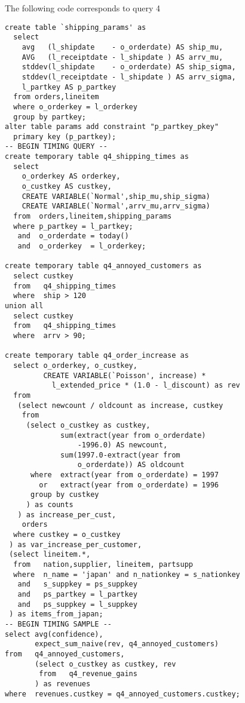 The following code corresponds to query 4
\begin{footnotesize}
\begin{verbatim}
create table `shipping_params' as
  select 
    avg   (l_shipdate    - o_orderdate) AS ship_mu,
    AVG   (l_receiptdate - l_shipdate ) AS arrv_mu,
    stddev(l_shipdate    - o_orderdate) AS ship_sigma,
    stddev(l_receiptdate - l_shipdate ) AS arrv_sigma,
    l_partkey AS p_partkey
  from orders,lineitem
  where o_orderkey = l_orderkey
  group by partkey;
alter table params add constraint "p_partkey_pkey" 
  primary key (p_partkey);
-- BEGIN TIMING QUERY --
create temporary table q4_shipping_times as
  select
    o_orderkey AS orderkey,
    o_custkey AS custkey,
    CREATE VARIABLE(`Normal',ship_mu,ship_sigma)
    CREATE VARIABLE(`Normal',arrv_mu,arrv_sigma)
  from  orders,lineitem,shipping_params
  where p_partkey = l_partkey;
   and  o_orderdate = today()
   and  o_orderkey  = l_orderkey;

create temporary table q4_annoyed_customers as
  select custkey
  from   q4_shipping_times
  where  ship > 120
union all
  select custkey
  from   q4_shipping_times
  where  arrv > 90;

create temporary table q4_order_increase as
  select o_orderkey, o_custkey,
         CREATE VARIABLE(`Poisson', increase) *
           l_extended_price * (1.0 - l_discount) as rev
  from
   (select newcount / oldcount as increase, custkey 
    from
     (select o_custkey as custkey, 
             sum(extract(year from o_orderdate)
                 -1996.0) AS newcount,
             sum(1997.0-extract(year from 
                 o_orderdate)) AS oldcount
      where  extract(year from o_orderdate) = 1997
        or   extract(year from o_orderdate) = 1996
      group by custkey
     ) as counts
   ) as increase_per_cust,
    orders
  where custkey = o_custkey
 ) as var_increase_per_customer,
 (select lineitem.*,
  from   nation,supplier, lineitem, partsupp
  where  n_name = 'japan' and n_nationkey = s_nationkey
   and   s_suppkey = ps_suppkey
   and   ps_partkey = l_partkey
   and   ps_suppkey = l_suppkey
 ) as items_from_japan;
-- BEGIN TIMING SAMPLE --
select avg(confidence),
       expect_sum_naive(rev, q4_annoyed_customers)
from   q4_annoyed_customers,
       (select o_custkey as custkey, rev
        from   q4_revenue_gains
       ) as revenues
where  revenues.custkey = q4_annoyed_customers.custkey;






\end{verbatim}
\end{footnotesize}